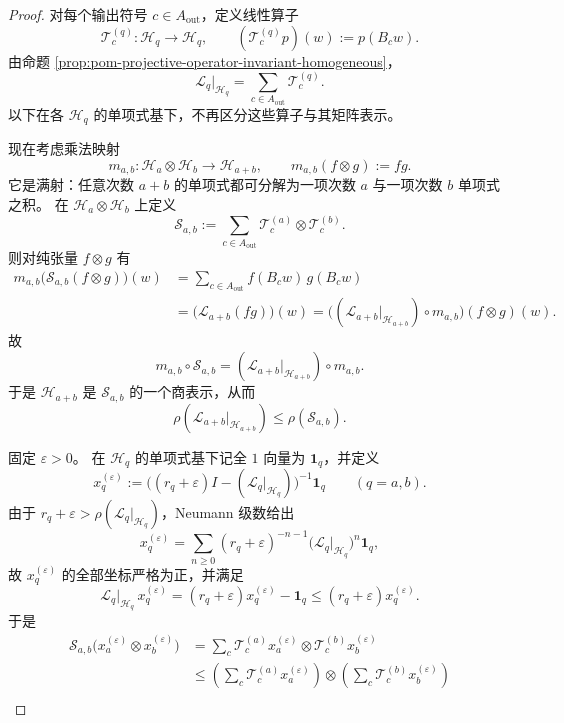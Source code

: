 \begin{proof}
对每个输出符号 \(c\in A_{\mathrm{out}}\)，定义线性算子
\[
\mathcal T_c^{(q)}:\mathcal H_q\longrightarrow \mathcal H_q,
\qquad
(\mathcal T_c^{(q)}p)(w):=p(B_cw).
\]
由命题 \ref{prop:pom-projective-operator-invariant-homogeneous}，
\[
\mathcal L_q|_{\mathcal H_q}=\sum_{c\in A_{\mathrm{out}}}\mathcal T_c^{(q)}.
\]
以下在各 \(\mathcal H_q\) 的单项式基下，不再区分这些算子与其矩阵表示。
\par
现在考虑乘法映射
\[
m_{a,b}:\mathcal H_a\otimes \mathcal H_b\longrightarrow \mathcal H_{a+b},
\qquad
m_{a,b}(f\otimes g):=fg.
\]
它是满射：任意次数 \(a+b\) 的单项式都可分解为一项次数 \(a\) 与一项次数 \(b\)
单项式之积。
在 \(\mathcal H_a\otimes\mathcal H_b\) 上定义
\[
\mathcal S_{a,b}:=\sum_{c\in A_{\mathrm{out}}}\mathcal T_c^{(a)}\otimes \mathcal T_c^{(b)}.
\]
则对纯张量 \(f\otimes g\) 有
\[
\begin{aligned}
m_{a,b}\!\bigl(\mathcal S_{a,b}(f\otimes g)\bigr)(w)
&=
\sum_{c\in A_{\mathrm{out}}} f(B_cw)\,g(B_cw)\\
&=
\bigl(\mathcal L_{a+b}(fg)\bigr)(w)
=
\bigl((\mathcal L_{a+b}|_{\mathcal H_{a+b}})\circ m_{a,b}\bigr)(f\otimes g)(w).
\end{aligned}
\]
故
\[
m_{a,b}\circ \mathcal S_{a,b}
=
(\mathcal L_{a+b}|_{\mathcal H_{a+b}})\circ m_{a,b}.
\]
于是 \(\mathcal H_{a+b}\) 是 \(\mathcal S_{a,b}\) 的一个商表示，从而
\[
\rho(\mathcal L_{a+b}|_{\mathcal H_{a+b}})\le \rho(\mathcal S_{a,b}).
\]
\par
固定 \(\varepsilon>0\)。
在 \(\mathcal H_q\) 的单项式基下记全 \(1\) 向量为 \(\mathbf 1_q\)，并定义
\[
x_q^{(\varepsilon)}
:=
\bigl((r_q+\varepsilon)I-(\mathcal L_q|_{\mathcal H_q})\bigr)^{-1}\mathbf 1_q
\qquad(q=a,b).
\]
由于 \(r_q+\varepsilon>\rho(\mathcal L_q|_{\mathcal H_q})\)，Neumann 级数给出
\[
x_q^{(\varepsilon)}
=
\sum_{n\ge 0}(r_q+\varepsilon)^{-n-1}
\bigl(\mathcal L_q|_{\mathcal H_q}\bigr)^n\mathbf 1_q,
\]
故 \(x_q^{(\varepsilon)}\) 的全部坐标严格为正，并满足
\[
\mathcal L_q|_{\mathcal H_q}\,x_q^{(\varepsilon)}
=(r_q+\varepsilon)x_q^{(\varepsilon)}-\mathbf 1_q
\le
(r_q+\varepsilon)x_q^{(\varepsilon)}.
\]
于是
\[
\begin{aligned}
\mathcal S_{a,b}\bigl(x_a^{(\varepsilon)}\otimes x_b^{(\varepsilon)}\bigr)
&=
\sum_c \mathcal T_c^{(a)}x_a^{(\varepsilon)}
\otimes
\mathcal T_c^{(b)}x_b^{(\varepsilon)}\\
&\le
\left(\sum_c \mathcal T_c^{(a)}x_a^{(\varepsilon)}\right)
\otimes
\left(\sum_c \mathcal T_c^{(b)}x_b^{(\varepsilon)}\right)\\

\end{aligned}\]
\end{proof}
